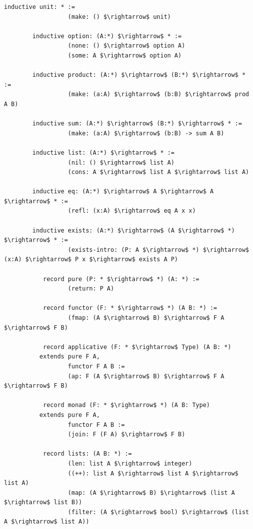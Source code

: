 \documentclass[11pt,oneside]{article}
\begin{document}
\begin{lstlisting}[mathescape=true]
        inductive unit: * :=
                  (make: () $\rightarrow$ unit)

        inductive option: (A:*) $\rightarrow$ * :=
                  (none: () $\rightarrow$ option A)
                  (some: A $\rightarrow$ option A)

        inductive product: (A:*) $\rightarrow$ (B:*) $\rightarrow$ * :=
                  (make: (a:A) $\rightarrow$ (b:B) $\rightarrow$ prod A B)

        inductive sum: (A:*) $\rightarrow$ (B:*) $\rightarrow$ * :=
                  (make: (a:A) $\rightarrow$ (b:B) -> sum A B)

        inductive list: (A:*) $\rightarrow$ * :=
                  (nil: () $\rightarrow$ list A)
                  (cons: A $\rightarrow$ list A $\rightarrow$ list A)

        inductive eq: (A:*) $\rightarrow$ A $\rightarrow$ A $\rightarrow$ * :=
                  (refl: (x:A) $\rightarrow$ eq A x x)

        inductive exists: (A:*) $\rightarrow$ (A $\rightarrow$ *) $\rightarrow$ * :=
                  (exists-intro: (P: A $\rightarrow$ *) $\rightarrow$ (x:A) $\rightarrow$ P x $\rightarrow$ exists A P)

           record pure (P: * $\rightarrow$ *) (A: *) :=
                  (return: P A)

           record functor (F: * $\rightarrow$ *) (A B: *) :=
                  (fmap: (A $\rightarrow$ B) $\rightarrow$ F A $\rightarrow$ F B)

           record applicative (F: * $\rightarrow$ Type) (A B: *)
          extends pure F A,
                  functor F A B :=
                  (ap: F (A $\rightarrow$ B) $\rightarrow$ F A $\rightarrow$ F B)

           record monad (F: * $\rightarrow$ *) (A B: Type)
          extends pure F A,
                  functor F A B :=
                  (join: F (F A) $\rightarrow$ F B)

           record lists: (A B: *) :=
                  (len: list A $\rightarrow$ integer)
                  ((++): list A $\rightarrow$ list A $\rightarrow$ list A)
                  (map: (A $\rightarrow$ B) $\rightarrow$ (list A $\rightarrow$ list B))
                  (filter: (A $\rightarrow$ bool) $\rightarrow$ (list A $\rightarrow$ list A))

\end{lstlisting}
\end{document}
